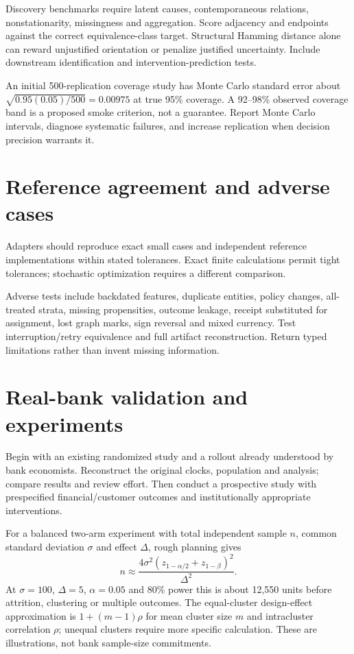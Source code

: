 Discovery benchmarks require latent causes, contemporaneous relations,
nonstationarity, missingness and aggregation. Score adjacency and endpoints
against the correct equivalence-class target. Structural Hamming distance
alone can reward unjustified orientation or penalize justified uncertainty.
Include downstream identification and intervention-prediction tests.

An initial 500-replication coverage study has Monte Carlo standard error
about $\sqrt{0.95(0.05)/500}=0.00975$ at true 95\% coverage.
A 92--98\% observed coverage band is a proposed smoke criterion, not a
guarantee. Report Monte Carlo intervals, diagnose systematic failures,
and increase replication when decision precision warrants it.

\section{Reference agreement and adverse cases}
Adapters should reproduce exact small cases and independent reference
implementations within stated tolerances. Exact finite calculations permit
tight tolerances; stochastic optimization requires a different comparison.

Adverse tests include backdated features, duplicate entities, policy
changes, all-treated strata, missing propensities, outcome leakage,
receipt substituted for assignment, lost graph marks, sign reversal and
mixed currency. Test interruption/retry equivalence and full artifact
reconstruction. Return typed limitations rather than invent missing
information.

\section{Real-bank validation and experiments}
Begin with an existing randomized study and a rollout already understood
by bank economists. Reconstruct the original clocks, population and
analysis; compare results and review effort. Then conduct a prospective
study with prespecified financial/customer outcomes and institutionally
appropriate interventions.

For a balanced two-arm experiment with total independent sample $n$,
common standard deviation $\sigma$ and effect $\Delta$, rough planning gives
\[
 n\approx\frac{4\sigma^2(z_{1-\alpha/2}+z_{1-\beta})^2}{\Delta^2}.
\]
At $\sigma=100$, $\Delta=5$, $\alpha=0.05$ and 80\% power this is
about 12,550 units before attrition, clustering or multiple outcomes.
The equal-cluster design-effect approximation is $1+(m-1)\rho$
for mean cluster size $m$ and intracluster correlation $\rho$;
unequal clusters require more specific calculation.
These are illustrations, not bank sample-size commitments.

